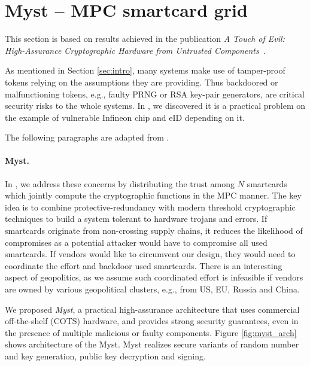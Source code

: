 \documentclass[
  digital, %
  twoside, %
  table,   %
  lof,     %
  lot,     %
]{fithesis3}
\newcounter{ph4_show_guides}
\theoremstyle{definition}
\theoremstyle{remark}
\begin{document}
% 

\section{Myst -- MPC smartcard grid}\label{sec:res:myst}
This section is based on results achieved in the publication \emph{A Touch of Evil: High-Assurance Cryptographic Hardware from Untrusted Components}~\cite{2017-ccs-mavroudis}. 

As mentioned in Section \ref{sec:intro}, many systems make use of tamper-proof tokens relying on the assumptions they are providing. Thus backdoored or malfunctioning tokens, e.g., faulty PRNG or RSA key-pair generators, are 
critical security risks to the whole systems. In \cite{2017-ccs-nemec}, we discovered it is a practical problem on the example of vulnerable Infineon chip and eID depending on it.

The following paragraphs are adapted from \cite{2017-ccs-mavroudis}.

\paragraph{Myst.}%
In \cite{2017-ccs-mavroudis}, we address these concerns by distributing the trust among $N$ smartcards which jointly compute the cryptographic functions in the MPC manner. 
The key idea is to combine
protective-redundancy with modern threshold cryptographic techniques to build a system tolerant to hardware trojans and errors. 
If smartcards originate from non-crossing supply chains, it reduces the likelihood of compromises as a potential attacker would have to compromise all used smartcards. 
If vendors would like to circumvent our design, they would need to coordinate the effort and backdoor used smartcards. There is an interesting aspect of geopolitics, as we assume such coordinated effort is infeasible if vendors are owned by various geopolitical clusters, e.g., from US, EU, Russia and China.

We proposed \emph{Myst}, a practical high-assurance architecture that uses commercial off-the-shelf (COTS) hardware, and provides strong security guarantees, even in the presence of multiple malicious or faulty components. Figure \ref{fig:myst_arch} shows architecture of the Myst.
Myst realizes secure variants of random number and key generation, public key decryption and signing.  
\end{document}
